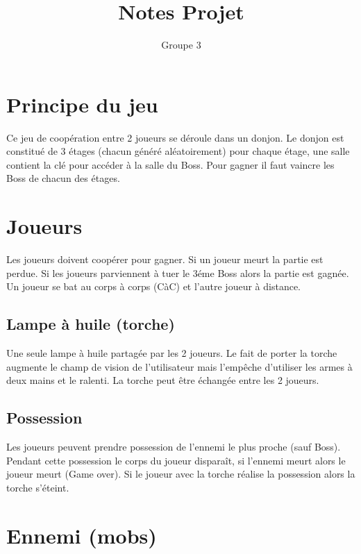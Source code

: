 \RequirePackage{cdo}
\title{Notes Projet}
\author{Groupe 3}


\maketitle

\section*{Principe du jeu}

Ce jeu de coopération entre 2 joueurs se déroule dans un donjon. Le donjon est constitué de 3 étages (chacun généré aléatoirement) pour chaque étage, une salle contient la clé pour accéder à la salle du Boss. Pour gagner il faut vaincre les Boss de chacun des étages.

\section{Joueurs}

Les joueurs doivent coopérer pour gagner. Si un joueur meurt la partie est perdue. Si les joueurs parviennent à tuer le 3éme Boss alors la partie est gagnée. Un joueur se bat au corps à corps (CàC) et l'autre joueur à distance.

\subsection*{Lampe à huile (torche)}

Une seule lampe à huile partagée par les 2 joueurs. Le fait de porter la torche augmente le champ de vision de l'utilisateur mais l'empêche d'utiliser les armes à deux mains et le ralenti. La torche peut être échangée entre les 2 joueurs.

\subsection*{Possession}

Les joueurs peuvent prendre possession de l'ennemi le plus proche (sauf Boss). Pendant cette possession le corps du joueur disparaît, si l'ennemi meurt alors le joueur meurt (Game over). Si le joueur avec la torche réalise la possession alors la torche s'éteint.

\section{Ennemi (mobs)}

